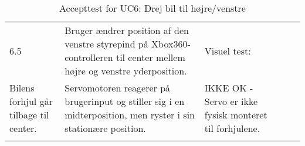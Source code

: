 \begin{longtable}{| l | >{\raggedright}X | >{\raggedright}X | >{\raggedright}X | >{\raggedright\arraybackslash}p{2.3cm} |}
	6.5 & Bruger ændrer position af den venstre styrepind på Xbox360-controlleren til center mellem højre og venstre yderposition.
		& Visuel test:\\ Bilens forhjul går tilbage til center.
		& Servomotoren reagerer på brugerinput og stiller sig i en midterposition, men ryster i sin stationære position.
		& IKKE OK - Servo er ikke fysisk monteret til forhjulene.\\ \hline		
		
\caption{Accepttest for UC6: Drej bil til højre/venstre}\label{tbl:acceptuc6}
\end{longtable}
